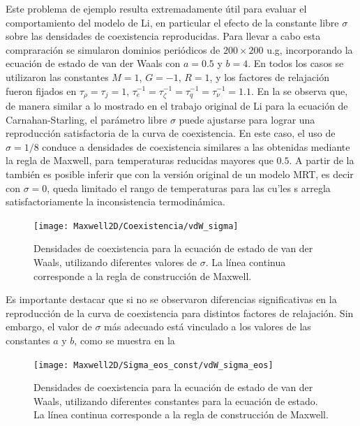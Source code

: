 Este problema de ejemplo resulta extremadamente \'util para evaluar el comportamiento del modelo de Li, en particular el efecto de la constante libre $\sigma$ sobre las densidades de coexistencia reproducidas. Para llevar a cabo esta compraraci\'on se simularon dominios peri\'odicos de $200\times 200$ u.g, incorporando la ecuaci\'on de estado de van der Waals con $a=0.5$ y $b=4$. En todos los casos se utilizaron las constantes $M=1$, $G=-1$, $R=1$, y los factores de relajaci\'on fueron fijados en $\tau_{\rho} = \tau_j=1$, $\tau_{e}^{-1}=\tau_{\zeta}^{-1}=\tau_{q}^{-1}=\tau_{\nu}^{-1}=1.1$. En la  se observa que, de manera similar a lo mostrado en el trabajo original de Li \cite{li_lattice_2013} para la ecuaci\'on de Carnahan-Starling, el par\'ametro libre $\sigma$ puede ajustarse para lograr una reproducci\'on satisfactoria de la curva de coexistencia. En este caso, el uso de $\sigma=1/8$ conduce a densidades de coexistencia similares a las obtenidas mediante la regla de Maxwell, para temperaturas reducidas mayores que $0.5$. A partir de la  tambi\'en es posible inferir que con la versi\'on original de un modelo \pp{} MRT, es decir con $\sigma=0$, queda limitado el rango de temperaturas para las cu\a'les s arregla satisfactoriamente la inconsistencia termodin\'amica.

\begin{figure}[ht]
	\centering
	\texttt{[image: Maxwell2D/Coexistencia/vdW\_sigma]}
	\caption{Densidades de coexistencia para la ecuaci\'on de estado de van der Waals, utilizando diferentes valores de $\sigma$. La l\'inea continua corresponde a la regla de construcci\'on de Maxwell.}
	\label{fig:maxwell_vdW}
\end{figure}

Es importante destacar que si no se observaron diferencias significativas en la reproducci\'on de la curva de coexistencia para distintos factores de relajaci\'on. Sin embargo, el valor de $\sigma$ m\'as adecuado est\'a vinculado a los valores de las constantes $a$ y $b$, como se muestra en la 

\begin{figure}[ht]
	\centering
	\texttt{[image: Maxwell2D/Sigma\_eos\_const/vdW\_sigma\_eos]}
	\caption{Densidades de coexistencia para la ecuaci\'on de estado de van der Waals, utilizando diferentes constantes para la ecuaci\'on de estado. La l\'inea continua corresponde a la regla de construcci\'on de Maxwell.}
	\label{fig:maxwell_vdW_eos}
\end{figure}


